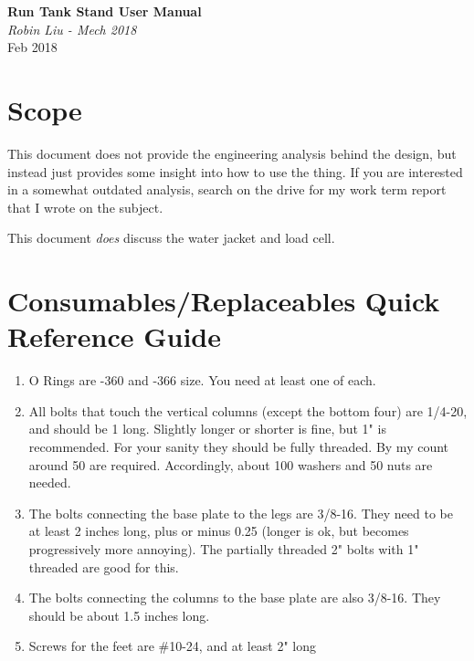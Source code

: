 \documentclass[11pt]{article}
\begin{document}
\begin{titlepage}
   \begin{center}
      \Large\textbf{Run Tank Stand User Manual}\\
      \bigskip
      \large\textit{Robin Liu - Mech 2018}\\
      \bigskip
      Feb 2018
   \end{center}
\end{titlepage}

\section{Scope}
This document does not provide the engineering analysis behind the design, but instead just provides some insight into how to use the thing. If you are interested in a somewhat outdated analysis, search on the drive for my work term report that I wrote on the subject.

This document \textit{does} discuss the water jacket and load cell.

\section{Consumables/Replaceables Quick Reference Guide}
\begin{enumerate}
	\item O Rings are -360 and -366 size. You need at least one of each.
	\item All bolts that touch the vertical columns (except the bottom four) are 1/4-20, and should be 1 long. Slightly longer or shorter is fine, but 1" is recommended. For your sanity they should be fully threaded. By my count around 50 are required. Accordingly, about 100 washers and 50 nuts are needed.
	\item The bolts connecting the base plate to the legs are 3/8-16. They need to be at least 2 inches long, plus or minus 0.25 (longer is ok, but becomes progressively more annoying). The partially threaded 2" bolts with 1" threaded are good for this.
	\item The bolts connecting the columns to the base plate are also 3/8-16. They should be about 1.5 inches long.
	\item Screws for the feet are \#10-24, and at least 2" long
\end{enumerate}
\end{document}
